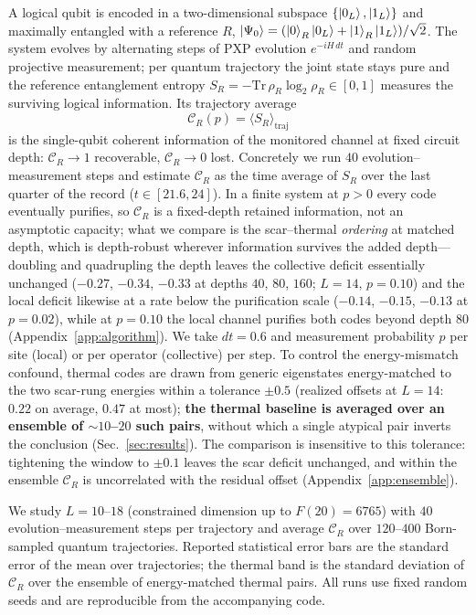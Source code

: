 \documentclass[aps,prb,twocolumn]{revtex4-2}
\newcommand{\CR}{\mathcal{C}_R}
\begin{document}
A logical qubit is encoded in a two-dimensional subspace
$\{\ket{0_L},\ket{1_L}\}$ and maximally entangled with a reference $R$,
$\ket{\Psi_0}=(\ket{0}_R\ket{0_L}+\ket{1}_R\ket{1_L})/\sqrt2$. The system
evolves by alternating steps of PXP evolution $e^{-iH\,dt}$ and random projective
measurement; per quantum trajectory the joint state stays pure and the reference
entanglement entropy $S_R=-\mathrm{Tr}\,\rho_R\log_2\rho_R\in[0,1]$ measures the
surviving logical information. Its trajectory average
\begin{equation}
\CR(p) = \big\langle S_R \big\rangle_{\text{traj}}
\end{equation}
is the single-qubit coherent information of the monitored channel at fixed
circuit depth: $\CR\to1$ recoverable, $\CR\to0$ lost. Concretely we run $40$
evolution--measurement steps and estimate $\CR$ as the time average of $S_R$
over the last quarter of the record ($t\in[21.6,24]$). In a finite system at
$p>0$ every code eventually purifies, so $\CR$ is a fixed-depth retained
information, not an asymptotic capacity; what we compare is the scar--thermal
\emph{ordering} at matched depth, which is depth-robust wherever information
survives the added depth---doubling and quadrupling the depth leaves the
collective deficit essentially unchanged ($-0.27$, $-0.34$, $-0.33$ at
depths $40$, $80$, $160$; $L{=}14$, $p{=}0.10$) and the local deficit
likewise at a rate below the purification scale ($-0.14$, $-0.15$, $-0.13$
at $p{=}0.02$), while at $p=0.10$ the local channel purifies both codes
beyond depth $80$ (Appendix~\ref{app:algorithm}). We take
$dt=0.6$ and measurement probability $p$ per site (local) or per operator
(collective) per step. To control the
energy-mismatch confound, thermal codes are drawn from generic eigenstates
energy-matched to the two scar-rung energies within a tolerance $\pm0.5$
(realized offsets at $L{=}14$: $0.22$ on average, $0.47$ at most);
\textbf{the thermal baseline is averaged over an ensemble of $\sim\!10$--$20$
such pairs}, without which a single atypical pair inverts the conclusion
(Sec.~\ref{sec:results}). The comparison is insensitive to this tolerance:
tightening the window to $\pm0.1$ leaves the scar deficit unchanged, and
within the ensemble $\CR$ is uncorrelated with the residual offset
(Appendix~\ref{app:ensemble}).

We study $L=10$--$18$ (constrained dimension up to $F(20)=6765$) with $40$
evolution--measurement steps per trajectory and average $\CR$ over $120$--$400$
Born-sampled quantum trajectories. Reported statistical error bars are the
standard error of the mean over trajectories; the thermal band is the standard
deviation of $\CR$ over the ensemble of energy-matched thermal pairs. All runs
use fixed random seeds and are reproducible from the accompanying code.
\end{document}
